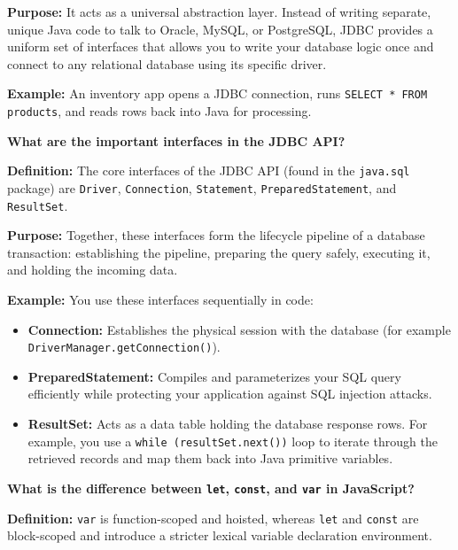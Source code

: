 \textbf{Purpose:} It acts as a universal abstraction layer. Instead of writing separate, unique Java code to talk to Oracle, MySQL, or PostgreSQL, JDBC provides a uniform set of interfaces that allows you to write your database logic once and connect to any relational database using its specific driver.

\textbf{Example:} An inventory app opens a JDBC connection, runs \texttt{SELECT * FROM products}, and reads rows back into Java for processing.

\question[0]
\textbf{What are the important interfaces in the JDBC API?}

\textbf{Definition:} The core interfaces of the JDBC API (found in the \texttt{java.sql} package) are \texttt{Driver}, \texttt{Connection}, \texttt{Statement}, \texttt{PreparedStatement}, and \texttt{ResultSet}.

\textbf{Purpose:} Together, these interfaces form the lifecycle pipeline of a database transaction: establishing the pipeline, preparing the query safely, executing it, and holding the incoming data.

\textbf{Example:} You use these interfaces sequentially in code:
\begin{itemize}
  \item \textbf{Connection:} Establishes the physical session with the database (for example \texttt{DriverManager.getConnection()}).
  \item \textbf{PreparedStatement:} Compiles and parameterizes your SQL query efficiently while protecting your application against SQL injection attacks.
  \item \textbf{ResultSet:} Acts as a data table holding the database response rows. For example, you use a \texttt{while (resultSet.next())} loop to iterate through the retrieved records and map them back into Java primitive variables.
\end{itemize}

\newpage


\question[0]
\textbf{What is the difference between \texttt{let}, \texttt{const}, and \texttt{var} in JavaScript?}

\textbf{Definition:} \texttt{var} is function-scoped and hoisted, whereas \texttt{let} and \texttt{const} are block-scoped and introduce a stricter lexical variable declaration environment.

